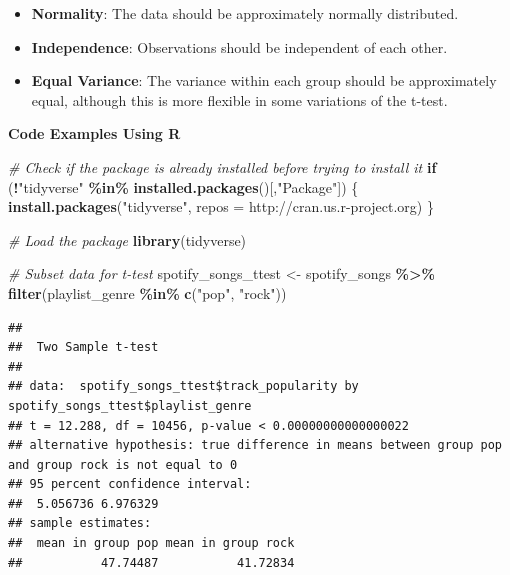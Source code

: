 \documentclass[
  b5paper]{book}
\newenvironment{Shaded}{\begin{snugshade}}{\end{snugshade}}
\newcommand{\AttributeTok}[1]{\textcolor[rgb]{0.13,0.29,0.53}{#1}}
\newcommand{\CommentTok}[1]{\textcolor[rgb]{0.56,0.35,0.01}{\textit{#1}}}
\newcommand{\ConstantTok}[1]{\textcolor[rgb]{0.56,0.35,0.01}{#1}}
\newcommand{\ControlFlowTok}[1]{\textcolor[rgb]{0.13,0.29,0.53}{\textbf{#1}}}
\newcommand{\FunctionTok}[1]{\textcolor[rgb]{0.13,0.29,0.53}{\textbf{#1}}}
\newcommand{\NormalTok}[1]{#1}
\newcommand{\OtherTok}[1]{\textcolor[rgb]{0.56,0.35,0.01}{#1}}
\newcommand{\SpecialCharTok}[1]{\textcolor[rgb]{0.81,0.36,0.00}{\textbf{#1}}}
\newcommand{\StringTok}[1]{\textcolor[rgb]{0.31,0.60,0.02}{#1}}
\providecommand{\tightlist}{%
  \setlength{\itemsep}{0pt}\setlength{\parskip}{0pt}}
\begin{document}
\begin{itemize}
\tightlist
\item
  \textbf{Normality}: The data should be approximately normally distributed.
\item
  \textbf{Independence}: Observations should be independent of each other.
\item
  \textbf{Equal Variance}: The variance within each group should be approximately equal, although this is more flexible in some variations of the t-test.
\end{itemize}

\textbf{Code Examples Using R}

\begin{Shaded}
\begin{Highlighting}[]
\CommentTok{\# Check if the package is already installed before trying to install it}
\ControlFlowTok{if}\NormalTok{ (}\SpecialCharTok{!}\StringTok{"tidyverse"} \SpecialCharTok{\%in\%} \FunctionTok{installed.packages}\NormalTok{()[,}\StringTok{"Package"}\NormalTok{]) \{}
  \FunctionTok{install.packages}\NormalTok{(}\StringTok{"tidyverse"}\NormalTok{, }\AttributeTok{repos =} \StringTok{\textquotesingle{}http://cran.us.r{-}project.org\textquotesingle{}}\NormalTok{)}
\NormalTok{\}}

\CommentTok{\# Load the package}
\FunctionTok{library}\NormalTok{(tidyverse)}

\CommentTok{\# Subset data for t{-}test}
\NormalTok{spotify\_songs\_ttest }\OtherTok{\textless{}{-}}\NormalTok{ spotify\_songs }\SpecialCharTok{\%\textgreater{}\%}
  \FunctionTok{filter}\NormalTok{(playlist\_genre }\SpecialCharTok{\%in\%} \FunctionTok{c}\NormalTok{(}\StringTok{"pop"}\NormalTok{, }\StringTok{"rock"}\NormalTok{))}
\end{Highlighting}
\end{Shaded}

\begin{Shaded}
\end{Shaded}

\begin{verbatim}
## 
##  Two Sample t-test
## 
## data:  spotify_songs_ttest$track_popularity by spotify_songs_ttest$playlist_genre
## t = 12.288, df = 10456, p-value < 0.00000000000000022
## alternative hypothesis: true difference in means between group pop and group rock is not equal to 0
## 95 percent confidence interval:
##  5.056736 6.976329
## sample estimates:
##  mean in group pop mean in group rock 
##           47.74487           41.72834
\end{verbatim}
\end{document}
